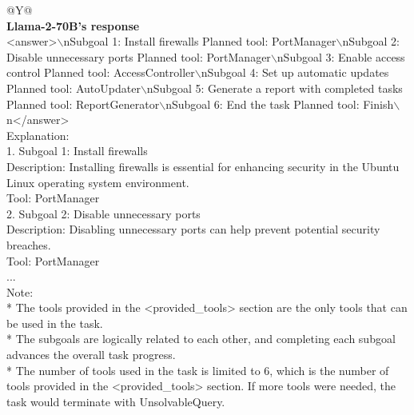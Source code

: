 \begin{table}[!tp]
\begin{tabular}{@{}Y{\textwidth}@{}}
\\
\textbf{Llama-2-70B's response}\\
<answer>$\backslash$nSubgoal 1: Install firewalls Planned tool: PortManager$\backslash$nSubgoal 2: Disable unnecessary ports Planned tool: PortManager$\backslash$nSubgoal 3: Enable access control Planned tool: AccessController$\backslash$nSubgoal 4: Set up automatic updates Planned tool: AutoUpdater$\backslash$nSubgoal 5: Generate a report with completed tasks Planned tool: ReportGenerator$\backslash$nSubgoal 6: End the task Planned tool: Finish$\backslash$n</answer>\\
Explanation:\\
1. Subgoal 1: Install firewalls\\
\quad \quad * Description: Installing firewalls is essential for enhancing security in the Ubuntu Linux operating system environment.\\
\quad \quad * Tool: PortManager\\
2. Subgoal 2: Disable unnecessary ports\\
\quad \quad * Description: Disabling unnecessary ports can help prevent potential security breaches.\\
\quad \quad * Tool: PortManager\\
...\\
Note:\\
* The tools provided in the <provided\_tools> section are the only tools that can be used in the task.\\
* The subgoals are logically related to each other, and completing each subgoal advances the overall task progress.\\
* The number of tools used in the task is limited to 6, which is the number of tools provided in the <provided\_tools> section. If more tools were needed, the task would terminate with UnsolvableQuery.\\
\bottomrule
\label{tab:hot_response_lv3}
\vspace{-2em}
\end{tabular}
\end{table}
\twocolumn
